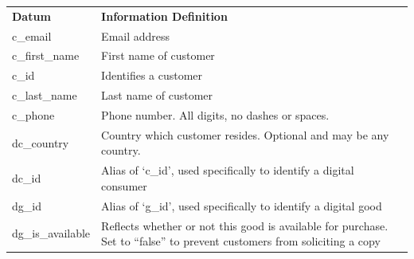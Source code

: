 \documentclass[11pt, a4paper]{report}
\begin{document}
\begin{longtable}{|l|p{10cm}|}

\hline
\textbf{Datum}          & \textbf{Information Definition} \\

c\_email                & Email address                                                                                                                                                         \\ \hline
c\_first\_name          & First name of customer                                                                                                                                                \\ \hline
c\_id                   & Identifies a customer                                                                                                                                                 \\ \hline
c\_last\_name           & Last name of customer                                                                                                                                                 \\ \hline
c\_phone                & Phone number. All digits, no dashes or spaces.                                                                                                                        \\ \hline
dc\_country             & Country which customer resides. Optional and may be any country.                                                                                                      \\ \hline
dc\_id                  & Alias of `c\_id', used specifically to identify a digital consumer                                                                                                     \\ \hline
dg\_id                  & Alias of `g\_id', used specifically to identify a digital good                                                                                                         \\ \hline
dg\_is\_available       & Reflects whether or not this good is available for purchase. Set to ``false'' to prevent customers from soliciting a copy                                               \\ \hline

\end{longtable}
\end{document}
